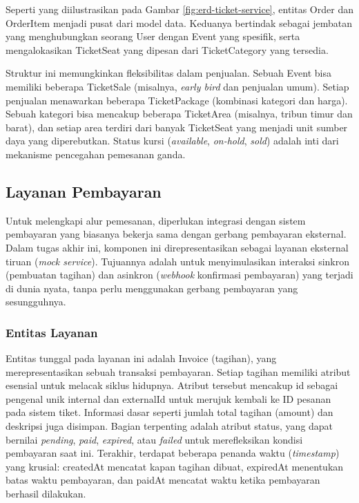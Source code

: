 Seperti yang diilustrasikan pada Gambar \ref{fig:erd-ticket-service}, entitas Order dan OrderItem menjadi pusat dari model data. Keduanya bertindak sebagai jembatan yang menghubungkan seorang User dengan Event yang spesifik, serta mengalokasikan TicketSeat yang dipesan dari TicketCategory yang tersedia.

Struktur ini memungkinkan fleksibilitas dalam penjualan. Sebuah Event bisa memiliki beberapa TicketSale (misalnya, \textit{early bird} dan penjualan umum). Setiap penjualan menawarkan beberapa TicketPackage (kombinasi kategori dan harga). Sebuah kategori bisa mencakup beberapa TicketArea (misalnya, tribun timur dan barat), dan setiap area terdiri dari banyak TicketSeat yang menjadi unit sumber daya yang diperebutkan. Status kursi (\textit{available}, \textit{on-hold}, \textit{sold}) adalah inti dari mekanisme pencegahan pemesanan ganda.

\subsection{Layanan Pembayaran}

Untuk melengkapi alur pemesanan, diperlukan integrasi dengan sistem pembayaran yang biasanya bekerja sama dengan gerbang pembayaran eksternal. Dalam tugas akhir ini, komponen ini direpresentasikan sebagai layanan eksternal tiruan (\textit{mock service}). Tujuannya adalah untuk menyimulasikan interaksi sinkron (pembuatan tagihan) dan asinkron (\textit{webhook} konfirmasi pembayaran) yang terjadi di dunia nyata, tanpa perlu menggunakan gerbang pembayaran yang sesungguhnya.

\subsubsection{Entitas Layanan}

Entitas tunggal pada layanan ini adalah Invoice (tagihan), yang merepresentasikan sebuah transaksi pembayaran. Setiap tagihan memiliki atribut esensial untuk melacak siklus hidupnya. Atribut tersebut mencakup id sebagai pengenal unik internal dan {externalId} untuk merujuk kembali ke ID pesanan pada sistem tiket. Informasi dasar seperti jumlah total tagihan (amount) dan deskripsi juga disimpan. Bagian terpenting adalah atribut status, yang dapat bernilai \textit{pending}, \textit{paid}, \textit{expired}, atau \textit{failed} untuk merefleksikan kondisi pembayaran saat ini. Terakhir, terdapat beberapa penanda waktu (\textit{timestamp}) yang krusial: createdAt mencatat kapan tagihan dibuat, expiredAt menentukan batas waktu pembayaran, dan paidAt mencatat waktu ketika pembayaran berhasil dilakukan.


